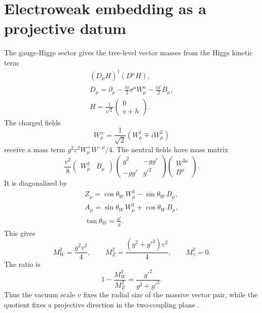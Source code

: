 \section{Electroweak embedding as a projective datum}
\label{sec:ew-embedding}

The gauge-Higgs sector gives the tree-level vector masses from the Higgs kinetic term
\begin{equation}
  \begin{gathered}
  (D_\mu H)^\dagger(D^\mu H),\\
  D_\mu=\partial_\mu-\frac{i g}{2}\sigma^a W^a_\mu
  -\frac{i g'}{2}B_\mu,\\
  H=\frac{1}{\sqrt2}\begin{pmatrix}0\\ v+h\end{pmatrix}.
  \end{gathered}
  \label{eq:higgs-kinetic}
\end{equation}
The charged fields
\begin{equation}
  W^\pm_\mu=\frac{1}{\sqrt2}\left(W^1_\mu\mp iW^2_\mu\right)
  \label{eq:wpm-fields}
\end{equation}
receive a mass term \(g^2v^2 W^+_\mu W^{-\mu}/4\).  The neutral fields have mass matrix
\begin{equation}
  \frac{v^2}{8}
  \begin{pmatrix} W^3_\mu & B_\mu \end{pmatrix}
  \begin{pmatrix}
    g^2 & -gg'\\
    -gg' & g'^2
  \end{pmatrix}
  \begin{pmatrix} W^{3\mu}\\ B^\mu \end{pmatrix}.
  \label{eq:neutral-mass-matrix}
\end{equation}
It is diagonalized by
\begin{equation}
  \begin{gathered}
  Z_\mu=\cos\theta_W\,W^3_\mu-\sin\theta_W\,B_\mu,\\
  A_\mu=\sin\theta_W\,W^3_\mu+\cos\theta_W\,B_\mu,\\
  \tan\theta_W=\frac{g'}{g}.
  \end{gathered}
  \label{eq:weak-rotation}
\end{equation}
This gives
\begin{equation}
  M_W^2=\frac{g^2v^2}{4},
  \qquad
  M_Z^2=\frac{(g^2+g'^2)v^2}{4},
  \qquad
  M_\gamma^2=0.
  \label{eq:tree-masses}
\end{equation}
The ratio is
\begin{equation}
  1-\frac{M_W^2}{M_Z^2}=\frac{g'^2}{g^2+g'^2}.
  \label{eq:tree-angle}
\end{equation}
Thus the vacuum scale \(v\) fixes the radial size of the massive vector pair, while the quotient fixes a projective direction in the two-coupling plane \cite{Logan2022,AlvarezGaumeVazquezMozo2023}.

